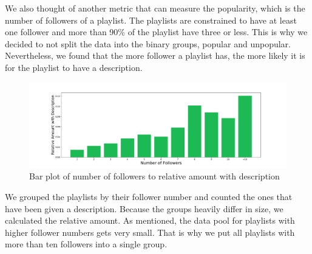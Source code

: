 We also thought of another metric that can measure the popularity, which is the number of followers of a playlist. The playlists are constrained to have at least one follower and more than 90\% of the playlist have three or less. This is why we decided to not split the data into the binary groups, popular and unpopular. Nevertheless, we found that the more follower a playlist has, the more likely it is for the playlist to have a description.

\begin{figure}[ht]
    \centering
    \includegraphics[width=\textwidth]{fig/followers_to_description.pdf}
    \caption{Bar plot of number of followers to relative amount with description}
    \label{fig:followers_to_description}
\end{figure}

We grouped the playlists by their follower number and counted the ones that have been given a description. Because the groups heavily differ in size, we calculated the relative amount. As mentioned, the data pool for playlists with higher follower numbers gets very small. That is why we put all playlists with more than ten followers into a single group.